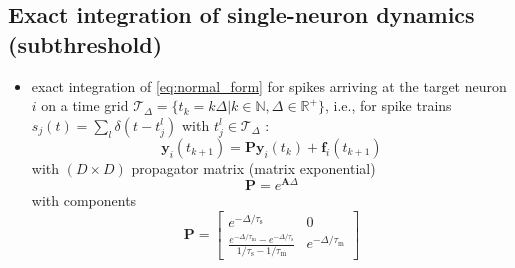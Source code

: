 \documentclass[10pt,a4paper,twoside,american]{article}
\theoremstyle{definitionstyle}
\newcommand{\tauM}{\tau_\text{m}}
\newcommand{\tauS}{\tau_\text{s}}
\begin{document}
\begin{appendices}
\section{Exact integration of  single-neuron dynamics (subthreshold)}
\label{sec:exact_integration}

\begin{itemize}
\item exact integration of \eqref{eq:normal_form} for spikes arriving at the target neuron $i$ on a time grid
  \mbox{$\mathcal{T}_\Delta= \{t_k=k\Delta{}|k\in\mathbb{N},\Delta\in\mathbb{R}^+\}$}, i.e.,
  for spike trains \mbox{$s_j(t) = \sum_l\delta(t-t_j^l)$} with $t_j^l\in\mathcal{T}_\Delta$ \citep{Rotter99_381}:
  \begin{equation}
    \label{eq:exact_integration}
    \bm{y}_i(t_{k+1}) = \bm{P}\bm{y}_i(t_k) + \bm{f}_i(t_{k+1})
  \end{equation}
  with $(D\times{}D)$ propagator matrix (matrix exponential)
  \begin{equation}
    \label{eq:matrix_exponential}
    \bm{P} = e^{\bm{A}\Delta}
  \end{equation}
  with components 
  \begin{equation}
	\bm{P} =
	\begin{bmatrix}
      		e^{-\Delta/\tauS} 					     & 0\\
		\frac{e^{-\Delta/\tauM}-e^{-\Delta/\tauS}}{1/\tauS-1/\tauM}  & e^{-\Delta/\tauM}
    	\end{bmatrix}
  \end{equation}
  \citep[see Sec.\,3.2.2 in][]{Rotter99_381}
\end{itemize}

\end{appendices}
\end{document}
